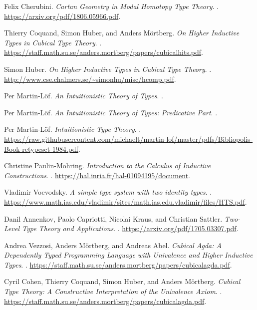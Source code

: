 \documentclass{article}
\begin{document}
\newpage
\begin{thebibliography}{99}

Felix Cherubini.
\newblock \emph{Cartan Geometry in Modal Homotopy Type Theory}.
. \url{https://arxiv.org/pdf/1806.05966.pdf}.

Thierry Coquand, Simon Huber, and Anders Mörtberg.
\newblock \emph{On Higher Inductive Types in Cubical Type Theory}.
. \url{https://staff.math.su.se/anders.mortberg/papers/cubicalhits.pdf}.

Simon Huber.
\newblock \emph{On Higher Inductive Types in Cubical Type Theory}.
. \url{http://www.cse.chalmers.se/~simonhu/misc/hcomp.pdf}.

Per Martin-Löf.
\newblock \emph{An Intuitionistic Theory of Types}.
.

Per Martin-Löf.
\newblock \emph{An Intuitionistic Theory of Types: Predicative Part}.
.

Per Martin-Löf.
\newblock \emph{Intuitionistic Type Theory}.
. \url{https://raw.githubusercontent.com/michaelt/martin-lof/master/pdfs/Bibliopolis-Book-retypeset-1984.pdf}.

Christine Paulin-Mohring.
\newblock \emph{Introduction to the Calculus of Inductive Constructions}.
. \url{https://hal.inria.fr/hal-01094195/document}.

Vladimir Voevodsky.
\newblock \emph{A simple type system with two identity types}.
. \url{https://www.math.ias.edu/vladimir/sites/math.ias.edu.vladimir/files/HTS.pdf}.

Danil Annenkov, Paolo Capriotti, Nicolai Kraus, and Christian Sattler.
\newblock \emph{Two-Level Type Theory and Applications}.
. \url{https://arxiv.org/pdf/1705.03307.pdf}.

Andrea Vezzosi, Anders Mörtberg, and Andreas Abel.
\newblock \emph{Cubical Agda: A Dependently Typed Programming Language with Univalence and Higher Inductive Types}.
. \url{https://staff.math.su.se/anders.mortberg/papers/cubicalagda.pdf}.

Cyril Cohen, Thierry Coquand, Simon Huber, and Anders Mörtberg.
\newblock \emph{Cubical Type Theory: A Constructive Interpretation of the Univalence Axiom}.
. \url{https://staff.math.su.se/anders.mortberg/papers/cubicalagda.pdf}.


\end{thebibliography}
\end{document}
